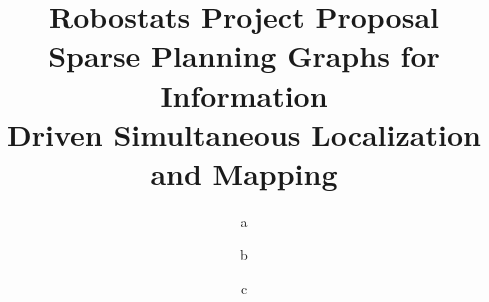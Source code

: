 \documentclass[]{article}
\begin{document}
\title{Robostats Project Proposal \\ Sparse Planning Graphs for Information \\ Driven Simultaneous Localization and Mapping}
\author{a}
\author{b}
\author{c}

\maketitle






\end{document}
